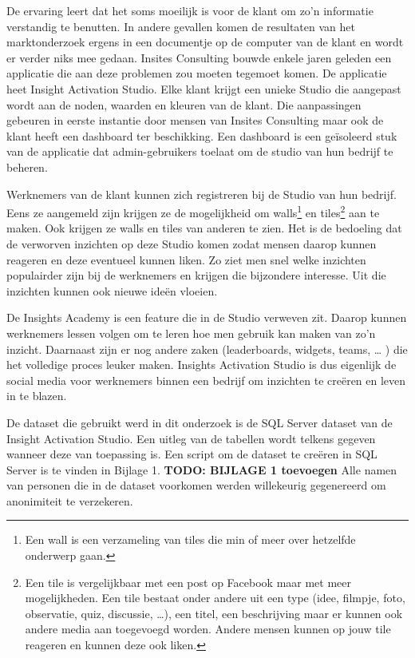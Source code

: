 De ervaring leert dat het soms moeilijk is voor de klant om zo'n informatie verstandig te benutten. In andere gevallen komen de resultaten van het marktonderzoek ergens in een documentje op de computer van de klant en wordt er verder niks mee gedaan. Insites Consulting bouwde enkele jaren geleden een applicatie die aan deze problemen zou moeten tegemoet komen. De applicatie heet Insight Activation Studio. Elke klant krijgt een unieke Studio die aangepast wordt aan de noden, waarden en kleuren van de klant. Die aanpassingen gebeuren in eerste instantie door mensen van Insites Consulting maar ook de klant heeft een dashboard ter beschikking. Een dashboard is een geïsoleerd stuk van de applicatie dat admin-gebruikers toelaat om de studio van hun bedrijf te beheren.  

Werknemers van de klant kunnen zich registreren bij de Studio van hun bedrijf. Eens ze aangemeld zijn krijgen ze de mogelijkheid om walls\footnote{Een wall is een verzameling van tiles die min of meer over hetzelfde onderwerp gaan.} en tiles\footnote{Een tile is vergelijkbaar met een post op Facebook maar met meer mogelijkheden. Een tile bestaat onder andere uit een type (idee, filmpje, foto, observatie, quiz, discussie, …), een titel, een beschrijving maar er kunnen ook andere media aan toegevoegd worden. Andere mensen kunnen op jouw tile reageren en kunnen deze ook liken.} aan te maken. Ook krijgen ze walls en tiles van anderen te zien. Het is de bedoeling dat de verworven inzichten op deze Studio komen zodat mensen daarop kunnen reageren en deze eventueel kunnen liken. Zo ziet men snel welke inzichten populairder zijn bij de werknemers en krijgen die bijzondere interesse. Uit die inzichten kunnen ook nieuwe ideën vloeien.

De Insights Academy is een feature die in de Studio verweven zit. Daarop kunnen werknemers lessen volgen om te leren hoe men gebruik kan maken van zo’n inzicht. Daarnaast zijn er nog andere zaken (leaderboards, widgets, teams, … ) die het volledige proces leuker maken. Insights Activation Studio is dus eigenlijk de social media voor werknemers binnen een bedrijf om inzichten te creëren en leven in te blazen.

De dataset die gebruikt werd in dit onderzoek is de SQL Server dataset van de Insight Activation Studio. Een uitleg van de tabellen wordt telkens gegeven wanneer deze van toepassing is. Een script om de dataset te creëren in SQL Server is te vinden in Bijlage 1. \textbf{TODO: BIJLAGE 1 toevoegen} Alle namen van personen die in de dataset voorkomen werden willekeurig gegenereerd om anonimiteit te verzekeren.

